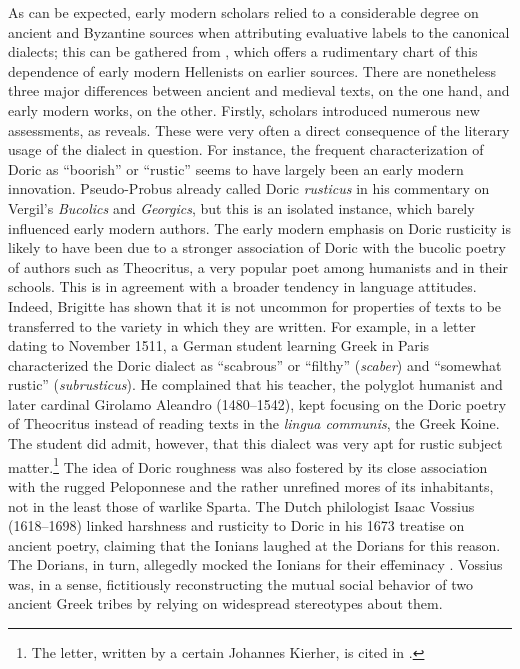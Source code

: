 As can be expected, early modern scholars relied to a considerable degree on ancient and Byzantine sources when attributing evaluative labels to the canonical dialects; this can be gathered from , which offers a rudimentary chart of this dependence of early modern Hellenists on earlier sources. There are nonetheless three major differences between ancient and medieval texts, on the one hand, and early modern works, on the other. Firstly, scholars introduced numerous new assessments, as  reveals. These were very often a direct consequence of the literary usage of the dialect in question. For instance, the frequent characterization of Doric as “boorish” or “rustic” seems to have largely been an early modern innovation. Pseudo-Probus already called Doric \textit{rusticus} in his commentary on Vergil’s \textit{Bucolics} and \textit{Georgics}, but this is an isolated instance, which barely influenced early modern authors. The early modern emphasis on Doric rusticity is likely to have been due to a stronger association of Doric with the bucolic poetry of authors such as Theocritus, a very popular poet among humanists and in their schools. This is in agreement with a broader tendency in language attitudes. Indeed, Brigitte \citet{Schlieben-lange1992} has shown that it is not uncommon for properties of texts to be transferred to the variety in which they are written. For example, in a letter dating to November 1511, a German student learning Greek in Paris characterized the Doric dialect as “scabrous” or “filthy” (\textit{scaber}) and “somewhat rustic” (\textit{subrusticus}). He complained that his teacher, the polyglot humanist and later cardinal Girolamo Aleandro (1480–1542), kept focusing on the Doric poetry of Theocritus instead of reading texts in the \textit{lingua communis}, the Greek Koine. The student did admit, however, that this dialect was very apt for rustic subject matter.\footnote{The letter, written by a certain Johannes Kierher, is cited in \citet[220 n.435; cf. also p. 103]{Botley2010}.} The idea of Doric roughness was also fostered by its close association with the rugged Peloponnese and the rather unrefined mores of its inhabitants, not in the least those of warlike Sparta. The Dutch philologist Isaac Vossius (1618–1698) linked harshness and rusticity to Doric in his 1673 treatise on ancient poetry, claiming that the Ionians laughed at the Dorians for this reason. The Dorians, in turn, allegedly mocked the Ionians for their effeminacy \citep[55]{Vossius1673}. Vossius was, in a sense, fictitiously reconstructing the mutual social behavior of two ancient Greek tribes by relying on widespread stereotypes about them.


